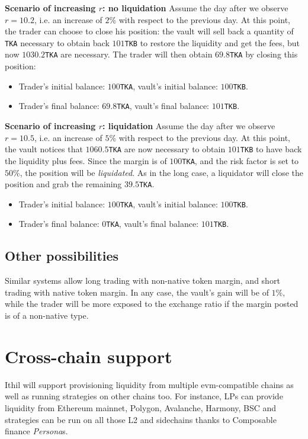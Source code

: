 \documentclass[a4paper,10 pt]{article}
\theoremstyle{definition}
\begin{document}
\textbf{Scenario of increasing $r$: no liquidation}
Assume the day after we observe $r = 10.2$, i.e. an increase of $2$\% with respect to the previous day.  At this point, the trader can choose to close his position: the vault will sell back a quantity of \verb|TKA| necessary to obtain back $101$\verb|TKB| to restore the liquidity and get the fees, but now $1030.2$\verb|TKA| are necessary. The trader will then obtain $69.8$\verb|TKA| by closing this position:
\begin{itemize}
    \item Trader's initial balance: $100$\verb|TKA|, vault's initial balance: $100$\verb|TKB|.
    \item Trader's final balance: $69.8$\verb|TKA|, vault's final balance: $101$\verb|TKB|.
\end{itemize}

\textbf{Scenario of increasing $r$: liquidation}
Assume the day after we observe $r = 10.5$, i.e. an increase of $5$\% with respect to the previous day.  At this point, the vault notices that $1060.5$\verb|TKA| are now necessary to obtain $101$\verb|TKB| to have back the liquidity plus fees. Since the margin is of $100$\verb|TKA|, and the risk factor is set to $50$\%, the position will be \emph{liquidated}. As in the long case, a liquidator will close the position and grab the remaining $39.5$\verb|TKA|.
\begin{itemize}
    \item Trader's initial balance: $100$\verb|TKA|, vault's initial balance: $100$\verb|TKB|.
    \item Trader's final balance: $0$\verb|TKA|, vault's final balance: $101$\verb|TKB|.
\end{itemize}

\subsection{Other possibilities}

Similar systems allow long trading with non-native token margin, and short trading with native token margin. In any case, the vault's gain will be of $1$\%, while the trader will be more exposed to the exchange ratio if the margin posted is of a non-native type.

\section{Cross-chain support}
Ithil will support provisioning liquidity from multiple evm-compatible chains as well as running strategies on other chains too.
For instance, LPs can provide liquidity from Ethereum mainnet, Polygon, Avalanche, Harmony, BSC and strategies can be run on all those L2 and sidechains thanks to Composable finance \textit{Persona}s.
\end{document}
